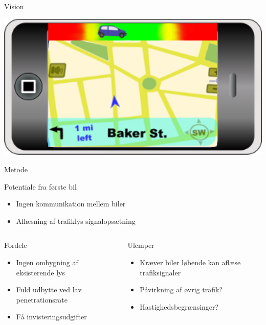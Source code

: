 \begin{frame}{Vision}
\begin{center}
\includegraphics[width=1\textwidth]{../images/product.png}
\end{center}
\end{frame}

\begin{frame}{Metode}

Potentiale fra første bil
\begin{itemize}
\item Ingen kommunikation mellem biler
\item Aflæsning af trafiklys signalopsætning
\end{itemize}

\vspace{5mm}
\begin{center}
\begin{columns}
\begin{column}{0.4\textwidth}
Fordele
\begin{itemize}
\item Ingen ombygning af eksisterende lys
\item Fuld udbytte ved lav penetrationsrate
\item Få invisteringsudgifter 
\end{itemize}
\end{column}

\begin{column}{0.5\textwidth}
Ulemper
\begin{itemize}
\item Kræver biler løbende kan aflæse trafiksignaler
\item Påvirkning af øvrig trafik?
\item Hastighedsbegrænsinger? %
\end{itemize}
\vspace{3mm}
\end{column}
\end{columns}
\end{center}
\end{frame}
